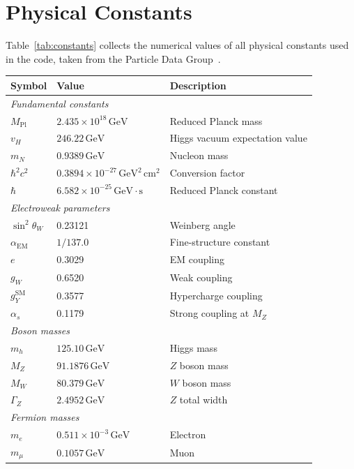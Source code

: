 \documentclass[11pt]{article}
\numberwithin{equation}{section}
\newcommand{\GeV}{\,\text{GeV}}
\newcommand{\cm}{\,\text{cm}}
\newcommand{\Mpl}{M_{\text{Pl}}}
\begin{document}
\section{Physical Constants}
\label{sec:constants}
Table~\ref{tab:constants} collects the numerical values of all physical constants used in the code, taken from the Particle Data Group~\cite{PhysRevD.110.030001}.

\begin{longtable}{lll}
\toprule
\textbf{Symbol} & \textbf{Value} & \textbf{Description} \\
\midrule
\endhead
\multicolumn{3}{l}{\textit{Fundamental constants}} \\
$\Mpl$ & $2.435\times 10^{18}\GeV$ & Reduced Planck mass \\
$v_H$ & $246.22\GeV$ & Higgs vacuum expectation value \\
$m_N$ & $0.9389\GeV$ & Nucleon mass \\
$\hbar^2 c^2$ & $0.3894\times 10^{-27}\GeV^2\cm^2$ & Conversion factor \\
$\hbar$ & $6.582\times 10^{-25}\GeV\cdot\text{s}$ & Reduced Planck constant \\
\midrule
\multicolumn{3}{l}{\textit{Electroweak parameters}} \\
$\sin^2\theta_W$ & 0.23121 & Weinberg angle \\
$\alpha_{\text{EM}}$ & $1/137.0$ & Fine-structure constant \\
$e$ & 0.3029 & EM coupling \\
$g_W$ & 0.6520 & Weak coupling \\
$g_Y^{\text{SM}}$ & 0.3577 & Hypercharge coupling \\
$\alpha_s$ & 0.1179 & Strong coupling at $M_Z$ \\
\midrule
\multicolumn{3}{l}{\textit{Boson masses}} \\
$m_h$ & $125.10\GeV$ & Higgs mass \\
$M_Z$ & $91.1876\GeV$ & $Z$ boson mass \\
$M_W$ & $80.379\GeV$ & $W$ boson mass \\
$\Gamma_Z$ & $2.4952\GeV$ & $Z$ total width \\
\midrule
\multicolumn{3}{l}{\textit{Fermion masses}} \\
$m_e$ & $0.511\times 10^{-3}\GeV$ & Electron \\
$m_\mu$ & $0.1057\GeV$ & Muon \\

\end{longtable}
\end{document}
